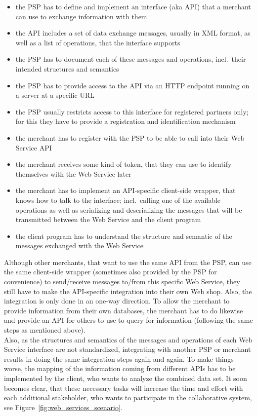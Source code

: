 \begin{itemize}
  \item the \gls{PSP} has to define and implement an interface (aka \gls{API}) that a merchant can use to exchange information with them
  \item the \gls{API} includes a set of data exchange messages, usually in \gls{XML} format, as well as a list of operations, that the interface supports
  \item the \gls{PSP} has to document each of these messages and operations, incl.\ their intended structures and semantics
  \item the \gls{PSP} has to provide access to the \gls{API} via an \gls{HTTP} endpoint running on a server at a specific \gls{URL}
  \item the \gls{PSP} usually restricts access to this interface for registered partners only; for this they have to provide a registration and identification mechanism
  \item the merchant has to register with the \gls{PSP} to be able to call into their Web Service \gls{API}
  \item the merchant receives some kind of token, that they can use to identify themselves with the Web Service later
  \item the merchant has to implement an \gls{API}-specific client-side wrapper, that knows how to talk to the interface; incl.\ calling one of the available operations as well as serializing and deserializing the messages that will be transmitted between the Web Service and the client program
  \item the client program has to understand the structure and semantic of the messages exchanged with the Web Service
\end{itemize}

Although other merchants, that want to use the same \gls{API} from the \gls{PSP}, can use the same client-side wrapper (sometimes also provided by the \gls{PSP} for convenience) to send/receive messages to/from this specific Web Service, they still have to make the \gls{API}-specific integration into their own Web shop. Also, the integration is only done in an one-way direction. To allow the merchant to provide information from their own databases, the merchant has to do likewise and provide an \gls{API} for others to use to query for information (following the same steps as mentioned above). \\

Also, as the structures and semantics of the messages and operations of each Web Service interface are not standardized, integrating with another \gls{PSP} or merchant results in doing the same integration steps again and again. To make things worse, the mapping of the information coming from different \gls{API}s has to be implemented by the client, who wants to analyze the combined data set.   It soon becomes clear, that these necessary tasks will increase the time and effort with each additional stakeholder, who wants to participate in the collaborative system, see Figure~\ref{fig:web_services_scenario}. \@

